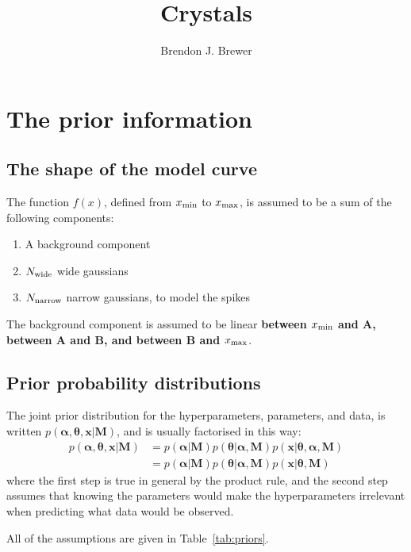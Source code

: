 \documentclass[a4paper, 12pt]{article}
\title{Crystals}
\author{Brendon J. Brewer}
\date{}
\newcommand{\hypers}{\boldsymbol{\alpha}}
\newcommand{\params}{\boldsymbol{\theta}}
\newcommand{\data}{\boldsymbol{x}}
\newcommand{\info}{\boldsymbol{M}}
\newcommand{\x}{x}
\newcommand{\todo}{\color{orange} \bf}
\begin{document}
\maketitle


\setlength{\parindent}{0pt}
\setlength{\parskip}{8pt}

\section{The prior information}

\subsection{The shape of the model curve}
The function $f(\x)$, defined from $\x_{\rm min}$ to $\x_{\rm max}$,
is assumed to be a sum of the following components:
\begin{enumerate}
\item A background component
\item $N_{\rm wide}$ wide gaussians
\item $N_{\rm narrow}$ narrow gaussians, to model the spikes
\end{enumerate}

The background component is assumed to be linear
{\todo between $x_{\rm min}$ and A, between A and B, and between B
and $x_{\rm max}$}.

\subsection{Prior probability distributions}

The joint prior distribution for the hyperparameters, parameters, and data,
is written $p(\hypers, \params, \data | \info)$, and is usually factorised
in this way:
\begin{align}
p(\hypers, \params, \data | \info) &=
    p(\hypers | \info)p(\params | \hypers, \info)
    p(\data | \params, \hypers, \info)\\
    &= p(\hypers | \info)p(\params | \hypers, \info)
    p(\data | \params, \info)
\end{align}
where the first step is true in general by the product rule, and the second
step assumes that knowing the parameters would make the hyperparameters
irrelevant when predicting what data would be observed.

All of the assumptions are given in Table~\ref{tab:priors}.
\end{document}
